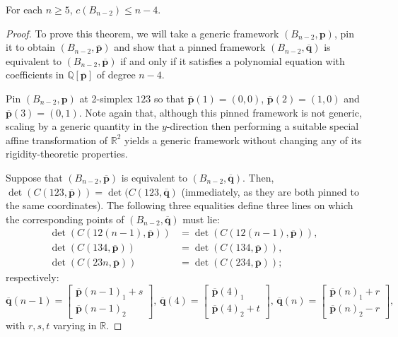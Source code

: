 \documentclass[10pt,a4paper]{amsart}
\begin{document}
\begin{theorem}\label{thm:bipcount}
    For each $n\geq 5$, $c(B_{n-2})\leq n-4$.
\end{theorem}

\begin{proof}
    To prove this theorem, we will take a generic framework $(B_{n-2},\mathbf{p})$, pin it to obtain $(B_{n-2},\overline{\mathbf{p}})$ and show that a pinned framework $(B_{n-2},\overline{\mathbf{q}})$ is equivalent to $(B_{n-2},\overline{\mathbf{p}})$ if and only if it satisfies a polynomial equation with coefficients in $\mathbb{Q}[\overline{\mathbf{p}}]$ of degree $n-4$.

    Pin $(B_{n-2},\mathbf{p})$ at 2-simplex $123$ so that $\overline{\mathbf{p}}(1)=(0,0)$, $\overline{\mathbf{p}}(2)=(1,0)$ and $\overline{\mathbf{p}}(3)=(0,1)$.
    Note again that, although this pinned framework is not generic, scaling by a generic quantity in the $y$-direction then performing a suitable special affine transformation of $\mathbb{R}^2$ yields a generic framework without changing any of its rigidity-theoretic properties.

    Suppose that $(B_{n-2},\overline{\mathbf{p}})$ is equivalent to $(B_{n-2},\overline{\mathbf{q}})$.
    Then, $\det(C(123,\overline{\mathbf{p}}))=\det(C(123,\overline{\mathbf{q}})$ (immediately, as they are both pinned to the same coordinates).
    The following three equalities define three lines on which the corresponding points of $(B_{n-2},\overline{\mathbf{q}})$ must lie:
    \begin{equation}
    \begin{split}
        \det(C(12(n-1),\overline{\mathbf{p}})) &= \det(C(12(n-1),\overline{\mathbf{p}})),\\
        \det(C(134,\overline{\mathbf{p}})) &= \det(C(134,\overline{\mathbf{p}})),\\
        \det(C(23n,\overline{\mathbf{p}})) &= \det(C(234,\overline{\mathbf{p}}));
    \end{split}
    \end{equation}
    respectively:
    \begin{equation}\label{eq:bip1}
        \overline{\mathbf{q}}(n-1) = \begin{bmatrix} \overline{\mathbf{p}}(n-1)_1 + s \\ \overline{\mathbf{p}}(n-1)_2 \end{bmatrix}\text{, }
        \overline{\mathbf{q}}(4) = \begin{bmatrix} \overline{\mathbf{p}}(4)_1 \\ \overline{\mathbf{p}}(4)_2 + t\end{bmatrix}\text{, }
        \overline{\mathbf{q}}(n) = \begin{bmatrix} \overline{\mathbf{p}}(n)_1 + r \\ \overline{\mathbf{p}}(n)_2 - r \end{bmatrix},
    \end{equation}
    with $r,s,t$ varying in $\mathbb{R}$.


\end{proof}
\end{document}
